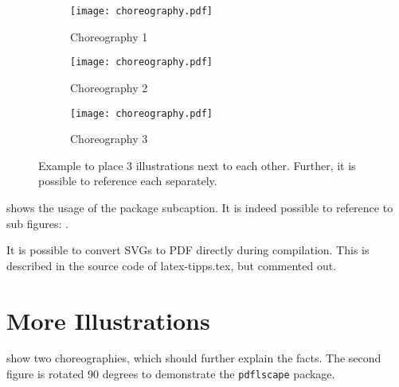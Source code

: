 \begin{figure}
  \hfill
  \begin{subfigure}{.3\textwidth}
    \texttt{[image: choreography.pdf]}
    \caption{Choreography 1}
    \label{fig:subfigA}
  \end{subfigure}
  \hfill
  \begin{subfigure}{.3\textwidth}
    \texttt{[image: choreography.pdf]}
    \caption{Choreography 2}
    \label{fig:subfigB}
  \end{subfigure}
  \hfill
  \begin{subfigure}{.3\textwidth}
    \texttt{[image: choreography.pdf]}
    \caption{Choreography 3}
    \label{fig:subfigC}
  \end{subfigure}
  \caption{Example to place 3 illustrations next to each other. Further, it is possible to reference each separately.}
  \label{fig:subfig_example}
\end{figure}

 shows the usage of the package subcaption.
It is indeed possible to reference to sub figures: .

It is possible to convert SVGs to PDF directly during compilation.
This is described in the source code of latex-tipps.tex, but commented out.

\iffalse %
  The SVG in \cref{fig:directSVG} is directly included, while the text in the SVG in \cref{fig:latexSVG} is set using pdflatex.
  If you want to see the graphics, inkscape must be in PATH and in the text source \texttt{\textbackslash{}iffalse} and \text{\textbackslash{}iftrue} have to be commented out.

  \begin{figure}
    \centering
    \texttt{[image: svgexample.svg]}
    \caption{SVG directly included}
    \label{fig:directSVG}
  \end{figure}

  \begin{figure}
    \centering
    \def\svgwidth{.4\textwidth}
    
    \caption{Text in SVN set via \LaTeX{}}
    \label{fig:latexSVG}
  \end{figure}
\fi %



\section{More Illustrations}
 show two choreographies, which should further explain the facts. The second figure is rotated 90 degrees to demonstrate the \texttt{pdflscape} package.

